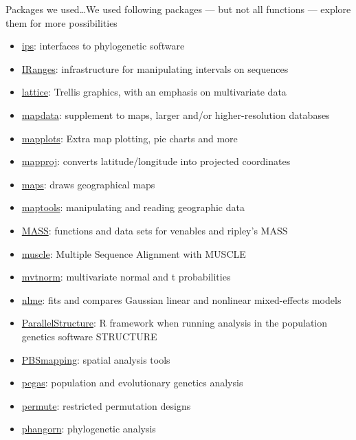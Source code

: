 \documentclass[compress, ucs, xelatex, 11pt, xcolor=svgnames,
  hyperref={
    bookmarks=true,
    unicode=true,
    colorlinks=true,
    pdftitle={Molecular data in R},
    plainpages=false,
    pdfauthor={Vojtech Zeisek},
    pdfsubject={Course about phylogeny and evolution in R},
    pdfcreator={XeLaTeX},
    pdfkeywords={R, evolution, phylogeny, molecular data},
    linkcolor=Tomato,
    anchorcolor=SaddleBrown,
    citecolor=Goldenrod,
    filecolor=DarkMagenta,
    menucolor=Sienna,
    urlcolor=DarkTurquoise,
    pdftex},
  url={hyphens, lowtilde} %
  ]{beamer}
\begin{document}
\begin{frame}[allowframebreaks]{Packages we used\ldots}{We used following packages --- but not all functions --- explore them for more possibilities}
\begin{itemize}
    \item \href{https://CRAN.R-project.org/package=ips}{ips}: interfaces to phylogenetic software
    \item \href{https://www.bioconductor.org/packages/3.4/bioc/html/IRanges.html}{IRanges}: infrastructure for manipulating intervals on sequences
    \item \href{https://CRAN.R-project.org/package=lattice}{lattice}: Trellis graphics, with an emphasis on multivariate data
    \item \href{https://CRAN.R-project.org/package=mapdata}{mapdata}: supplement to maps, larger and/or higher-resolution databases
    \item \href{https://CRAN.R-project.org/package=mapplots}{mapplots}: Extra map plotting, pie charts and more
    \item \href{https://CRAN.R-project.org/package=mapproj}{mapproj}: converts latitude/longitude into projected coordinates
    \item \href{https://CRAN.R-project.org/package=maps}{maps}: draws geographical maps
    \item \href{https://CRAN.R-project.org/package=maptools}{maptools}: manipulating and reading geographic data
    \item \href{https://CRAN.R-project.org/package=MASS}{MASS}: functions and data sets for venables and ripley's MASS
    \item \href{https://www.bioconductor.org/packages/3.4/bioc/html/muscle.html}{muscle}: Multiple Sequence Alignment with MUSCLE
    \item \href{https://CRAN.R-project.org/package=mvtnorm}{mvtnorm}: multivariate normal and t probabilities
    \item \href{https://CRAN.R-project.org/package=nlme}{nlme}: fits and compares Gaussian linear and nonlinear mixed-effects models
    \item \href{https://r-forge.r-project.org/projects/parallstructure/}{ParallelStructure}: R framework when running analysis in the population genetics software STRUCTURE
    \item \href{https://CRAN.R-project.org/package=PBSmapping}{PBSmapping}: spatial analysis tools
    \item \href{https://CRAN.R-project.org/package=pegas}{pegas}: population and evolutionary genetics analysis
    \item \href{https://CRAN.R-project.org/package=permute}{permute}: restricted permutation designs
    \item \href{https://CRAN.R-project.org/package=phangorn}{phangorn}: phylogenetic analysis

\end{itemize}
\end{frame}
\end{document}
